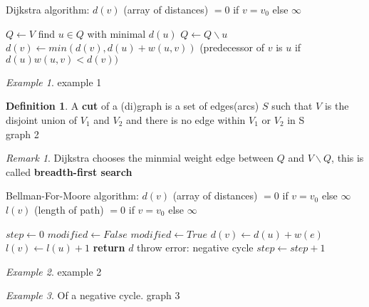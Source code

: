 \documentclass{article}
\theoremstyle{definition}
\newtheorem*{definition}{Definition}
\theoremstyle{remark}
\newtheorem*{remark}{Remark}
\newtheorem*{example}{Example}
\begin{document}
\begin{algorithm}
    Dijkstra algorithm: $d(v)$ (array of distances) $= 0 $ if $ v=v_0$ else $\infty$
    \begin{algorithmic}

    \State $Q \gets V$
        \State find $u \in Q$ with minimal $d(u)$
        \State $Q \gets Q \backslash u$
            \State $d(v) \gets min(d(v), d(u)+w(u,v))$
            \State (predecessor of $v$ is $u$ if $d(u) w(u,v) < d(v))$
        \EndFor
    \EndWhile
    \end{algorithmic}
\end{algorithm}
\begin{example}
    example 1
\end{example}
\begin{definition}
    A \textbf{cut} of a (di)graph is a set of edges(arcs) $S$ such that $V$ is the disjoint union of $V_1$ and $V_2$ and there is no edge within $V_1$ or $V_2$ in S\\
    graph 2
\end{definition}
\begin{remark}
    Dijkstra chooses the minmial weight edge between $Q$ and $V\backslash Q$, this is called \textbf{breadth-first search}
\end{remark}
\begin{algorithm}
    Bellman-For-Moore algorithm: $d(v)$ (array of distances) $= 0 $ if $ v=v_0 $ else $ \infty$
    $l(v)$ (length of path) $= 0 $ if $ v=v_0 $ else $ \infty$
    \begin{algorithmic}
    \State $step \gets 0$
        \State $modified \gets False$
                    \State $modified \gets True$
                    \State $d(v) \gets d(u)+w(e)$
                    \State $l(v) \gets l(u)+1$
                \EndIf
            \EndFor
        \EndFor
            \State \textbf{return} $d$
        \Else
                \State throw error: negative cycle
            \Else 
                \State $step \gets step+1$
            \EndIf
        \EndIf
    \EndWhile
    \end{algorithmic}
\end{algorithm}
\begin{example}
    example 2
\end{example}
\begin{example}
    Of a negative cycle. graph 3
\end{example}
\end{document}
